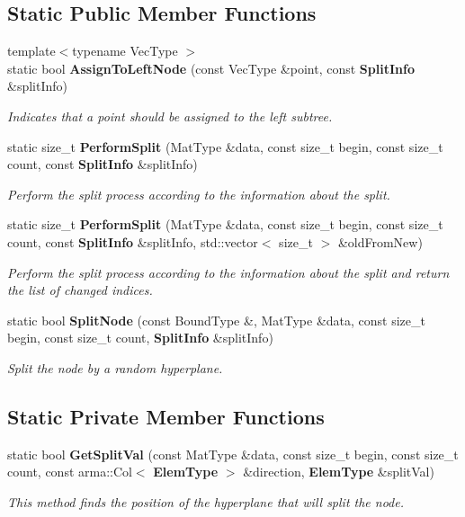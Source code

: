 \subsection*{Static Public Member Functions}
\begin{DoxyCompactItemize}
\item 
{\footnotesize template$<$typename Vec\+Type $>$ }\\static bool {\bf Assign\+To\+Left\+Node} (const Vec\+Type \&point, const {\bf Split\+Info} \&split\+Info)
\begin{DoxyCompactList}\small\item\em Indicates that a point should be assigned to the left subtree. \end{DoxyCompactList}\item 
static size\+\_\+t {\bf Perform\+Split} (Mat\+Type \&data, const size\+\_\+t begin, const size\+\_\+t count, const {\bf Split\+Info} \&split\+Info)
\begin{DoxyCompactList}\small\item\em Perform the split process according to the information about the split. \end{DoxyCompactList}\item 
static size\+\_\+t {\bf Perform\+Split} (Mat\+Type \&data, const size\+\_\+t begin, const size\+\_\+t count, const {\bf Split\+Info} \&split\+Info, std\+::vector$<$ size\+\_\+t $>$ \&old\+From\+New)
\begin{DoxyCompactList}\small\item\em Perform the split process according to the information about the split and return the list of changed indices. \end{DoxyCompactList}\item 
static bool {\bf Split\+Node} (const Bound\+Type \&, Mat\+Type \&data, const size\+\_\+t begin, const size\+\_\+t count, {\bf Split\+Info} \&split\+Info)
\begin{DoxyCompactList}\small\item\em Split the node by a random hyperplane. \end{DoxyCompactList}\end{DoxyCompactItemize}
\subsection*{Static Private Member Functions}
\begin{DoxyCompactItemize}
\item 
static bool {\bf Get\+Split\+Val} (const Mat\+Type \&data, const size\+\_\+t begin, const size\+\_\+t count, const arma\+::\+Col$<$ {\bf Elem\+Type} $>$ \&direction, {\bf Elem\+Type} \&split\+Val)
\begin{DoxyCompactList}\small\item\em This method finds the position of the hyperplane that will split the node. \end{DoxyCompactList}\end{DoxyCompactItemize}


